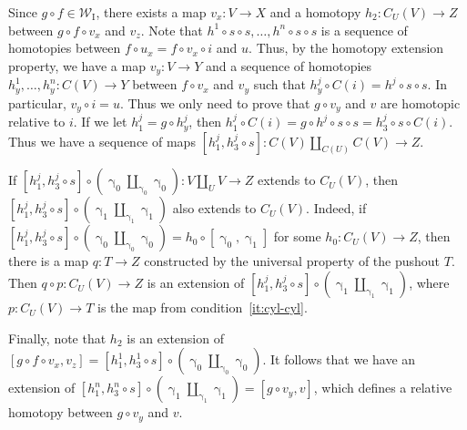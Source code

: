 \documentclass{tac}
\theoremstyle{definition}
\newcommand{\we}{\mathcal{W}}
\newcommand{\I}{\mathrm{I}}
\newcommand{\cyli}{\upgamma}
\begin{document}
Since $g \circ f \in \we_\I$, there exists a map $v_x : V \to X$ and a homotopy $h_2 : C_U(V) \to Z$ between $g \circ f \circ v_x$ and $v_z$.
Note that $h^1 \circ s \circ s, \ldots, h^n \circ s \circ s$ is a sequence of homotopies between $f \circ u_x = f \circ v_x \circ i$ and $u$.
Thus, by the homotopy extension property, we have a map $v_y : V \to Y$ and a sequence of homotopies $h^1_y, \ldots, h^n_y : C(V) \to Y$ between $f \circ v_x$ and $v_y$ such that $h^j_y \circ C(i) = h^j \circ s \circ s$.
In particular, $v_y \circ i = u$.
Thus we only need to prove that $g \circ v_y$ and $v$ are homotopic relative to $i$.
If we let $h^j_1 = g \circ h^j_y$, then $h^j_1 \circ C(i) = g \circ h^j \circ s \circ s = h^j_3 \circ s \circ C(i)$.
Thus we have a sequence of maps $[h^j_1, h^j_3 \circ s] : C(V) \amalg_{C(U)} C(V) \to Z$.

If $[h^j_1, h^j_3 \circ s] \circ (\cyli_0 \amalg_{\cyli_0} \cyli_0) : V \amalg_U V \to Z$ extends to $C_U(V)$, then $[h^j_1, h^j_3 \circ s] \circ (\cyli_1 \amalg_{\cyli_1} \cyli_1)$ also extends to $C_U(V)$.
Indeed, if $[h^j_1, h^j_3 \circ s] \circ (\cyli_0 \amalg_{\cyli_0} \cyli_0) = h_0 \circ [\cyli_0,\cyli_1]$ for some $h_0 : C_U(V) \to Z$,
then there is a map $q : T \to Z$ constructed by the universal property of the pushout $T$.
Then $q \circ p : C_U(V) \to Z$ is an extension of $[h^j_1, h^j_3 \circ s] \circ (\cyli_1 \amalg_{\cyli_1} \cyli_1)$, where $p : C_U(V) \to T$ is the map from condition~\eqref{it:cyl-cyl}.

Finally, note that $h_2$ is an extension of $[g \circ f \circ v_x, v_z] = [h^1_1, h^1_3 \circ s] \circ (\cyli_0 \amalg_{\cyli_0} \cyli_0)$.
It follows that we have an extension of $[h^n_1, h^n_3 \circ s] \circ (\cyli_1 \amalg_{\cyli_1} \cyli_1) = [g \circ v_y, v]$,
which defines a relative homotopy between $g \circ v_y$ and $v$.
\end{document}
